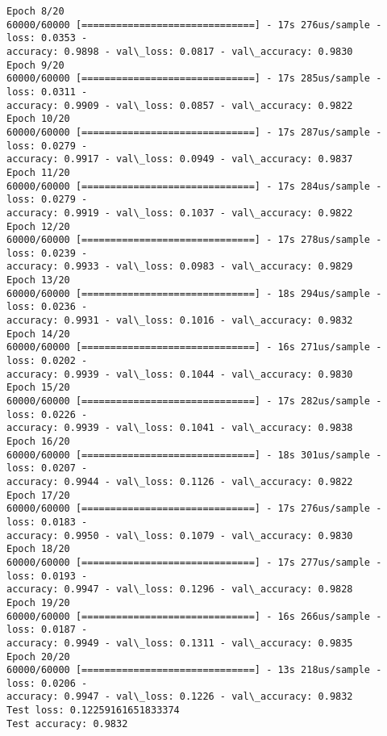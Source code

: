 \documentclass[11pt]{article}
\makeatletter
\newcommand{\boxspacing}{\kern\kvtcb@left@rule\kern\kvtcb@boxsep}
\newcommand{\prompt}[4]{
        \ttfamily\llap{{\color{#2}[#3]:\hspace{3pt}#4}}\vspace{-\baselineskip}
    }
\makeatother
\begin{document}
\begin{Verbatim}[commandchars=\\\{\}]
Epoch 8/20
60000/60000 [==============================] - 17s 276us/sample - loss: 0.0353 -
accuracy: 0.9898 - val\_loss: 0.0817 - val\_accuracy: 0.9830
Epoch 9/20
60000/60000 [==============================] - 17s 285us/sample - loss: 0.0311 -
accuracy: 0.9909 - val\_loss: 0.0857 - val\_accuracy: 0.9822
Epoch 10/20
60000/60000 [==============================] - 17s 287us/sample - loss: 0.0279 -
accuracy: 0.9917 - val\_loss: 0.0949 - val\_accuracy: 0.9837
Epoch 11/20
60000/60000 [==============================] - 17s 284us/sample - loss: 0.0279 -
accuracy: 0.9919 - val\_loss: 0.1037 - val\_accuracy: 0.9822
Epoch 12/20
60000/60000 [==============================] - 17s 278us/sample - loss: 0.0239 -
accuracy: 0.9933 - val\_loss: 0.0983 - val\_accuracy: 0.9829
Epoch 13/20
60000/60000 [==============================] - 18s 294us/sample - loss: 0.0236 -
accuracy: 0.9931 - val\_loss: 0.1016 - val\_accuracy: 0.9832
Epoch 14/20
60000/60000 [==============================] - 16s 271us/sample - loss: 0.0202 -
accuracy: 0.9939 - val\_loss: 0.1044 - val\_accuracy: 0.9830
Epoch 15/20
60000/60000 [==============================] - 17s 282us/sample - loss: 0.0226 -
accuracy: 0.9939 - val\_loss: 0.1041 - val\_accuracy: 0.9838
Epoch 16/20
60000/60000 [==============================] - 18s 301us/sample - loss: 0.0207 -
accuracy: 0.9944 - val\_loss: 0.1126 - val\_accuracy: 0.9822
Epoch 17/20
60000/60000 [==============================] - 17s 276us/sample - loss: 0.0183 -
accuracy: 0.9950 - val\_loss: 0.1079 - val\_accuracy: 0.9830
Epoch 18/20
60000/60000 [==============================] - 17s 277us/sample - loss: 0.0193 -
accuracy: 0.9947 - val\_loss: 0.1296 - val\_accuracy: 0.9828
Epoch 19/20
60000/60000 [==============================] - 16s 266us/sample - loss: 0.0187 -
accuracy: 0.9949 - val\_loss: 0.1311 - val\_accuracy: 0.9835
Epoch 20/20
60000/60000 [==============================] - 13s 218us/sample - loss: 0.0206 -
accuracy: 0.9947 - val\_loss: 0.1226 - val\_accuracy: 0.9832
Test loss: 0.12259161651833374
Test accuracy: 0.9832
    \end{Verbatim}

    \begin{tcolorbox}[breakable, size=fbox, boxrule=1pt, pad at break*=1mm,colback=cellbackground, colframe=cellborder]
\prompt{In}{incolor}{ }{\boxspacing}
\begin{Verbatim}[commandchars=\\\{\}]

\end{Verbatim}
\end{tcolorbox}


    
    
    
\end{document}
